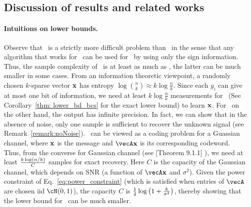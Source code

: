 \subsection{Discussion of results and related works}
\paragraph{Intuitions on lower bounds.} Observe that \bcs\ is a strictly more difficult problem than \spl\ in the sense that any algorithm that works for \bcs\ can be used for \spl\ by using only the sign information. Thus, the sample complexity of \bcs\ is at least as much as \spl, the latter can be much smaller in some cases. From an information theoretic viewpoint, a randomly chosen $k$-sparse vector $\mathbf{x}$ has entropy $\log{n \choose k}\approx k\log\frac{n}{k}$. Since each $y_i$ can give at most one bit of information, we need at least $k\log\frac{n}{k}$ measurements for \bcs\ (See Corollary~\ref{thm: lower_bd_bcs} for the exact lower bound) to learn $\mathbf{x}$. For \spl\ on the other hand, the output has infinite precision. In fact, we can show that in the absence of noise, only one sample is sufficient to recover the unknown signal (see Remark~\ref{remark:noNoise}). \spl\ can be viewed as a coding problem for a Guassian channel, where $\mathbf{x}$ is the message and $\vecA\bx$ is its corresponding codeword. Thus, from the converse for Gaussian channel (see [Theorem 9.1.1] \cite{thomas2006elements}), we need at least $\frac{k\log\left(n/k\right)}{C}$ samples for exact recovery. Here $C$ is the capacity of the Gaussian channel, which depends on SNR (a function of $\vecA\bx$ and $\sigma^2$). 
Given the power constraint of Eq.~\eqref{eq:power_constraint} (which is satisfied when entries of $\vecA$ are chosen iid $\cN(0,1)$),  the capacity $C$ is $\frac{1}{2}\log\left(1+\frac{k}{\sigma^2}\right)$, thereby showing that the lower bound for \spl\ can be much smaller. 



